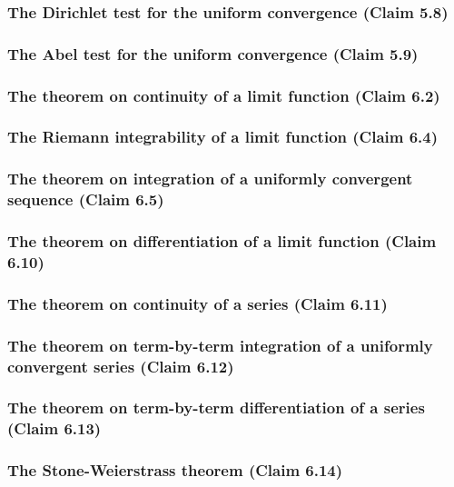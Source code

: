 \subsubsection{The Dirichlet test for the uniform convergence (Claim 5.8)}

\subsubsection{The Abel test for the uniform convergence (Claim 5.9)}

\subsubsection{The theorem on continuity of a limit function (Claim 6.2)}

\subsubsection{The Riemann integrability of a limit function (Claim 6.4)}

\subsubsection{The theorem on integration of a uniformly convergent sequence (Claim 6.5)}

\subsubsection{The theorem on differentiation of a limit function (Claim 6.10)}

\subsubsection{The theorem on continuity of a series (Claim 6.11)}

\subsubsection{The theorem on term-by-term integration of a uniformly convergent series (Claim 6.12)}

\subsubsection{The theorem on term-by-term differentiation of a series (Claim 6.13)}

\subsubsection{The Stone-Weierstrass theorem (Claim 6.14)}

